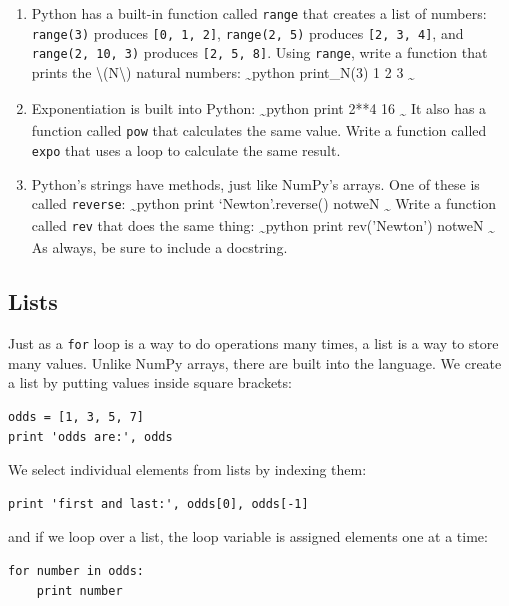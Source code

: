 \documentclass[]{book}
\begin{document}
\begin{enumerate}
\item
  Python has a built-in function called \texttt{range} that creates a
  list of numbers: \texttt{range(3)} produces \texttt{{[}0, 1, 2{]}},
  \texttt{range(2, 5)} produces \texttt{{[}2, 3, 4{]}}, and
  \texttt{range(2, 10, 3)} produces \texttt{{[}2, 5, 8{]}}. Using
  \texttt{range}, write a function that prints the
  \textbackslash{}(N\textbackslash{}) natural numbers:
  \textsubscript{\textasciitilde{}}python print\_N(3) 1 2 3
  \textsubscript{\textasciitilde{}}
\item
  Exponentiation is built into Python:
  \textsubscript{\textasciitilde{}}python print 2**4 16
  \textsubscript{\textasciitilde{}} It also has a function called
  \texttt{pow} that calculates the same value. Write a function called
  \texttt{expo} that uses a loop to calculate the same result.
\item
  Python's strings have methods, just like NumPy's arrays. One of these
  is called \texttt{reverse}: \textsubscript{\textasciitilde{}}python
  print `Newton'.reverse() notweN \textsubscript{\textasciitilde{}}
  Write a function called \texttt{rev} that does the same thing:
  \textsubscript{\textasciitilde{}}python print rev('Newton') notweN
  \textsubscript{\textasciitilde{}} As always, be sure to include a
  docstring.
\end{enumerate}

\subsection{Lists}

Just as a \texttt{for} loop is a way to do operations many times, a list
is a way to store many values. Unlike NumPy arrays, there are built into
the language. We create a list by putting values inside square brackets:

\begin{verbatim}
odds = [1, 3, 5, 7]
print 'odds are:', odds
\end{verbatim}

We select individual elements from lists by indexing them:

\begin{verbatim}
print 'first and last:', odds[0], odds[-1]
\end{verbatim}

and if we loop over a list, the loop variable is assigned elements one
at a time:

\begin{verbatim}
for number in odds:
    print number
\end{verbatim}
\end{document}
